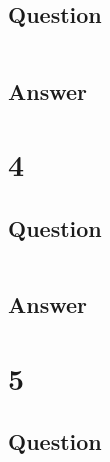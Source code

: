\documentclass[letterpaper,11pt]{article}
\newcommand*{\srcPath}{../src}%
\begin{document}
\subsection*{Question}

\begin{verbatim}

\end{verbatim}

\subsection*{Answer}

% 

\clearpage


\section*{4}

\subsection*{Question}

\begin{verbatim}

\end{verbatim}

\subsection*{Answer}




\clearpage


\section*{5}

\subsection*{Question}
\end{document}
